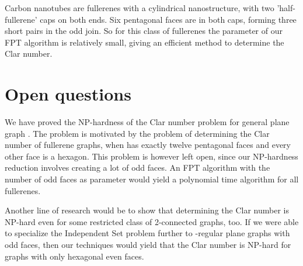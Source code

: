 \documentclass{article}
\begin{document}
Carbon nanotubes are fullerenes with a cylindrical nanostructure, with two 'half-fullerene' caps on both ends. Six pentagonal faces are in both caps, forming three short pairs in the odd join. So for this class of fullerenes the parameter of our FPT algorithm is relatively small, giving an efficient method to determine the Clar number.

\section{Open questions}
We have proved the NP-hardness of the Clar number problem for general plane
graph .  The problem is motivated by the problem of determining the Clar number of fullerene graphs, when   has exactly
twelve pentagonal faces and every other face is a hexagon. This problem is
however left open, since our NP-hardness
reduction involves creating a lot of odd faces. An FPT algorithm with the number of odd faces as parameter would yield a polynomial time algorithm for all fullerenes.

Another line of research would be to show that determining the Clar
number is NP-hard even for some restricted class of 2-connected
graphs, too. If we were able to specialize the Independent Set problem
further to -regular plane graphs with odd faces, then our
techniques would yield that the Clar number is NP-hard for graphs
with only hexagonal even faces.



\end{document}
